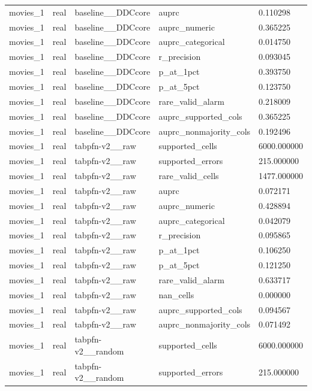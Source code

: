 \begin{tabular}{lllll}
movies\_1 & real & baseline\_\_DDCcore & auprc & 0.110298 \\
movies\_1 & real & baseline\_\_DDCcore & auprc\_numeric & 0.365225 \\
movies\_1 & real & baseline\_\_DDCcore & auprc\_categorical & 0.014750 \\
movies\_1 & real & baseline\_\_DDCcore & r\_precision & 0.093045 \\
movies\_1 & real & baseline\_\_DDCcore & p\_at\_1pct & 0.393750 \\
movies\_1 & real & baseline\_\_DDCcore & p\_at\_5pct & 0.123750 \\
movies\_1 & real & baseline\_\_DDCcore & rare\_valid\_alarm & 0.218009 \\
movies\_1 & real & baseline\_\_DDCcore & auprc\_supported\_cols & 0.365225 \\
movies\_1 & real & baseline\_\_DDCcore & auprc\_nonmajority\_cols & 0.192496 \\
movies\_1 & real & tabpfn-v2\_\_raw & supported\_cells & 6000.000000 \\
movies\_1 & real & tabpfn-v2\_\_raw & supported\_errors & 215.000000 \\
movies\_1 & real & tabpfn-v2\_\_raw & rare\_valid\_cells & 1477.000000 \\
movies\_1 & real & tabpfn-v2\_\_raw & auprc & 0.072171 \\
movies\_1 & real & tabpfn-v2\_\_raw & auprc\_numeric & 0.428894 \\
movies\_1 & real & tabpfn-v2\_\_raw & auprc\_categorical & 0.042079 \\
movies\_1 & real & tabpfn-v2\_\_raw & r\_precision & 0.095865 \\
movies\_1 & real & tabpfn-v2\_\_raw & p\_at\_1pct & 0.106250 \\
movies\_1 & real & tabpfn-v2\_\_raw & p\_at\_5pct & 0.121250 \\
movies\_1 & real & tabpfn-v2\_\_raw & rare\_valid\_alarm & 0.633717 \\
movies\_1 & real & tabpfn-v2\_\_raw & nan\_cells & 0.000000 \\
movies\_1 & real & tabpfn-v2\_\_raw & auprc\_supported\_cols & 0.094567 \\
movies\_1 & real & tabpfn-v2\_\_raw & auprc\_nonmajority\_cols & 0.071492 \\
movies\_1 & real & tabpfn-v2\_\_random & supported\_cells & 6000.000000 \\
movies\_1 & real & tabpfn-v2\_\_random & supported\_errors & 215.000000 \\

\end{tabular}
